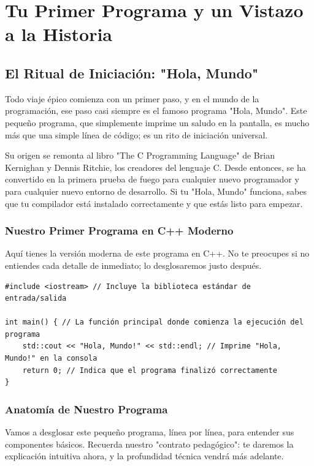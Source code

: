 \chapter{Tu Primer Programa y un Vistazo a la Historia}
\label{chap:hola_mundo}


\section{El Ritual de Iniciación: "Hola, Mundo"}
\label{sec:ritual_hola_mundo}

Todo viaje épico comienza con un primer paso, y en el mundo de la programación, ese paso casi siempre es el famoso programa "Hola, Mundo". Este pequeño programa, que simplemente imprime un saludo en la pantalla, es mucho más que una simple línea de código; es un rito de iniciación universal.

Su origen se remonta al libro "The C Programming Language" de Brian Kernighan y Dennis Ritchie, los creadores del lenguaje C. Desde entonces, se ha convertido en la primera prueba de fuego para cualquier nuevo programador y para cualquier nuevo entorno de desarrollo. Si tu "Hola, Mundo" funciona, sabes que tu compilador está instalado correctamente y que estás listo para empezar.

\subsection{Nuestro Primer Programa en C++ Moderno}
Aquí tienes la versión moderna de este programa en C++. No te preocupes si no entiendes cada detalle de inmediato; lo desglosaremos justo después.

\begin{lstlisting}
#include <iostream> // Incluye la biblioteca estándar de entrada/salida

int main() { // La función principal donde comienza la ejecución del programa
    std::cout << "Hola, Mundo!" << std::endl; // Imprime "Hola, Mundo!" en la consola
    return 0; // Indica que el programa finalizó correctamente
}
\end{lstlisting}

\subsection{Anatomía de Nuestro Programa}
Vamos a desglosar este pequeño programa, línea por línea, para entender sus componentes básicos. Recuerda nuestro "contrato pedagógico": te daremos la explicación intuitiva ahora, y la profundidad técnica vendrá más adelante.

